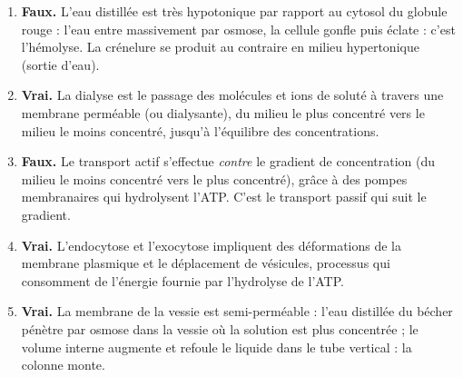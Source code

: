 \documentclass[11pt]{article}
\newcommand{\cle}[1]{{\popxbold\color{popdark}#1}}
\begin{document}
\begin{corrige}
\begin{enumerate}
\item \textbf{Faux.} L'eau distillée est très hypotonique par rapport au cytosol du globule rouge : l'eau entre massivement par osmose, la cellule gonfle puis éclate : c'est l'\cle{hémolyse}. La crénelure se produit au contraire en milieu hypertonique (sortie d'eau).
\item \textbf{Vrai.} La \cle{dialyse} est le passage des molécules et ions de soluté à travers une membrane perméable (ou dialysante), du milieu le plus concentré vers le milieu le moins concentré, jusqu'à l'équilibre des concentrations.
\item \textbf{Faux.} Le \cle{transport actif} s'effectue \emph{contre} le gradient de concentration (du milieu le moins concentré vers le plus concentré), grâce à des pompes membranaires qui hydrolysent l'ATP. C'est le transport passif qui suit le gradient.
\item \textbf{Vrai.} L'\cle{endocytose} et l'\cle{exocytose} impliquent des déformations de la membrane plasmique et le déplacement de vésicules, processus qui consomment de l'énergie fournie par l'hydrolyse de l'ATP.
\item \textbf{Vrai.} La membrane de la vessie est semi-perméable : l'eau distillée du bécher pénètre par osmose dans la vessie où la solution est plus concentrée ; le volume interne augmente et refoule le liquide dans le tube vertical : la colonne monte.
\end{enumerate}
\end{corrige}
\end{document}
